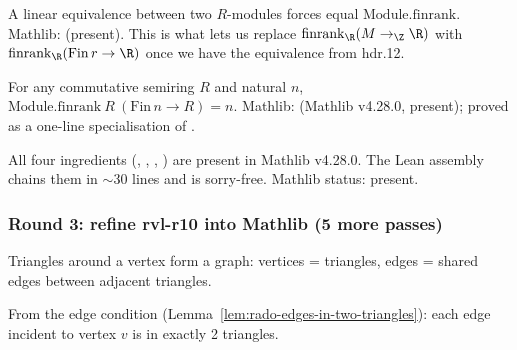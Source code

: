 \begin{lemma}
\label{lem:hdr-r13}
A linear equivalence between two $R$-modules forces equal $\mathrm{Module.finrank}$.  Mathlib:  (present).  This is what lets us replace $\mathrm{finrank}_\R(M \to_\Z \R)$ with $\mathrm{finrank}_\R(\mathrm{Fin}\,r \to \R)$ once we have the equivalence from hdr.12.
\leanok\mathlibok
\end{lemma}

\begin{lemma}[Pass hdr.14: $\mathrm{finrank}_\R(\mathrm{Fin}\,r \to \R) = r$]
\label{lem:hdr-r14}
For any commutative semiring $R$ and natural $n$, $\mathrm{Module.finrank}\ R\ (\mathrm{Fin}\,n \to R) = n$.  Mathlib:  (Mathlib v4.28.0, present); proved as a one-line specialisation of .
\leanok\mathlibok
\end{lemma}

\begin{lemma}
\label{lem:hdr-r15}
All four ingredients (, , , ) are present in Mathlib v4.28.0.  The Lean assembly  chains them in $\sim 30$ lines and is sorry-free.  Mathlib status: present.
\leanok\mathlibok
\end{lemma}

\subsubsection*{Round 3: refine rvl-r10 into Mathlib (5 more passes)}

\begin{lemma}
\label{lem:rvl-r11}
Triangles around a vertex form a graph: vertices = triangles, edges = shared edges between adjacent triangles.
\leanok\mathlibok
\end{lemma}

\begin{lemma}
\label{lem:rvl-r12}
From the edge condition (Lemma~\ref{lem:rado-edges-in-two-triangles}): each edge incident to vertex $v$ is in exactly 2 triangles.
\leanok\mathlibok
\end{lemma}

